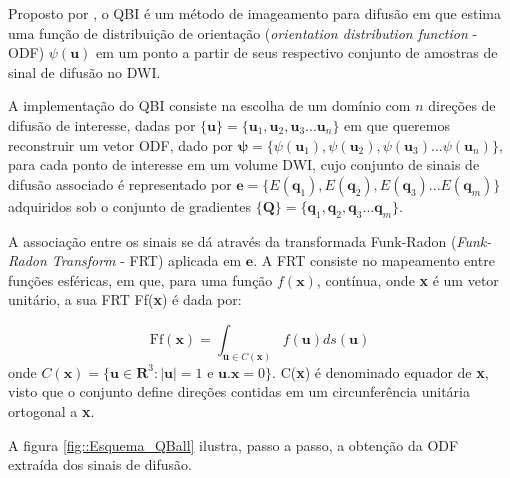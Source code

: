 \documentclass[
    12pt,                %
    oneside,            %
    a4paper,            %
    english,            %
    french,                %
    spanish,            %
    brazil                %
    ]{abntex2}
\begin{document}
Proposto por , o QBI é um método de imageamento para difusão em que estima uma função de distribuição de orientação (\textit{orientation distribution function} - ODF) $\psi(\mathbf{u})$ em um ponto a partir de seus respectivo conjunto de amostras de sinal de difusão no DWI.

A implementação do QBI consiste na escolha de um domínio com $n$ direções de difusão de interesse, dadas por $\{\textbf{u} \}= \{ \textbf{u}_1, \textbf{u}_2, \textbf{u}_3 ... \textbf{u}_n\}$ em que queremos reconstruir um vetor ODF, dado por $ \boldsymbol{\psi} = \{ \psi(\mathbf{u}_1), \psi(\mathbf{u}_2), \psi(\mathbf{u}_3) ... \psi(\mathbf{u}_n)\}$, para cada ponto de interesse em um volume DWI, cujo conjunto de sinais de difusão associado é representado por $\boldsymbol{e} = \{ E(\mathbf{q}_1), E(\mathbf{q}_2), E(\mathbf{q}_3) ... E(\mathbf{q}_m)\}$ adquiridos sob o conjunto de gradientes $\{\textbf{Q} \}= \{ \textbf{q}_1, \textbf{q}_2, \textbf{q}_3 ... \textbf{q}_m\}$. 


A associação entre os sinais se dá através da transformada Funk-Radon (\textit{Funk-Radon Transform} - FRT) aplicada em $ \boldsymbol{e}$. A FRT consiste no mapeamento entre funções esféricas, em que, para uma função $f(\mathbf{x})$, contínua, onde \textbf{x} é um vetor unitário, a sua FRT Ff(\textbf{x}) é dada por:

\begin{equation}
    \text{Ff}(\textbf{x}) = \int_{\textbf{u}\in C(\textbf{x})}f(\textbf{u})ds(\textbf{u})
\end{equation}
onde $C(\textbf{x}) = \{ \mathbf{u} \in  \mathbf{R}^3:|\mathbf{u}|=1 \text{ e } \mathbf{u}.\mathbf{x} = 0  \}$. C(\textbf{x}) é denominado equador de \textbf{x}, visto que o conjunto define direções contidas em um circunferência unitária ortogonal a \textbf{x}.


A figura \ref{fig::Esquema_QBall} ilustra, passo a passo, a obtenção da ODF extraída dos sinais de difusão.
\end{document}
